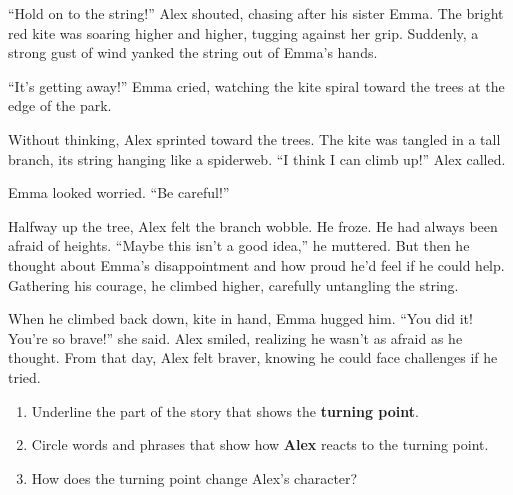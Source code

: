\documentclass[12pt]{article}
\begin{document}
\vspace{1em}
\begin{tcolorbox}[colframe=black!60, colback=white, 
coltitle=black, colbacktitle=black!15, fonttitle=\bfseries\Large, 
title=Text: The Runaway Kite, halign title=center, left=10pt, right=10pt, top=10pt, bottom=15pt]




“Hold on to the string!” Alex shouted, chasing after his sister Emma. The bright red kite was soaring higher and higher, tugging against her grip. Suddenly, a strong gust of wind yanked the string out of Emma’s hands. 

“It’s getting away!” Emma cried, watching the kite spiral toward the trees at the edge of the park.

Without thinking, Alex sprinted toward the trees. The kite was tangled in a tall branch, its string hanging like a spiderweb. “I think I can climb up!” Alex called. 

Emma looked worried. “Be careful!”

Halfway up the tree, Alex felt the branch wobble. He froze. He had always been afraid of heights. “Maybe this isn’t a good idea,” he muttered. But then he thought about Emma’s disappointment and how proud he’d feel if he could help. Gathering his courage, he climbed higher, carefully untangling the string.

When he climbed back down, kite in hand, Emma hugged him. “You did it! You’re so brave!” she said. Alex smiled, realizing he wasn’t as afraid as he thought. From that day, Alex felt braver, knowing he could face challenges if he tried.


 

 

\end{tcolorbox}

\vspace{1em}


\begin{tcolorbox}[colframe=black!60, colback=white, 
coltitle=black, colbacktitle=black!15, fonttitle=\bfseries\Large, 
title=Guided Practice, halign title=center, left=10pt, right=10pt, top=10pt, bottom=15pt]

\begin{enumerate}[itemsep=1em]
    \item Underline the part of the story that shows the \textbf{turning point}.
    \item Circle words and phrases that show how \textbf{Alex} reacts to the turning point.
    \item How does the turning point change Alex's character?
    \\[0.8cm] \underline{\hspace{14cm}}  
    \\[0.8cm] \underline{\hspace{14cm}}  
    \\[0.8cm] \underline{\hspace{14cm}} 
\end{enumerate}
\end{tcolorbox}
\vspace{1em}
\end{document}
